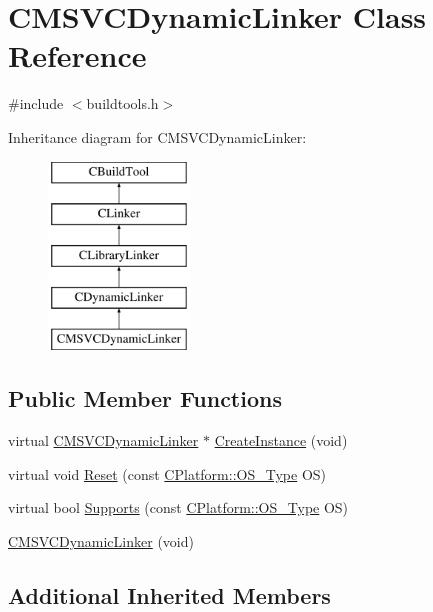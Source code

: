 \hypertarget{classCMSVCDynamicLinker}{\section{C\-M\-S\-V\-C\-Dynamic\-Linker Class Reference}
\label{classCMSVCDynamicLinker}
}


{\ttfamily \#include $<$buildtools.\-h$>$}

Inheritance diagram for C\-M\-S\-V\-C\-Dynamic\-Linker\-:\begin{figure}[H]
\begin{center}
\leavevmode
\includegraphics[height=5.000000cm]{da/d24/classCMSVCDynamicLinker}
\end{center}
\end{figure}
\subsection*{Public Member Functions}
\begin{DoxyCompactItemize}
\item 
virtual \hyperlink{classCMSVCDynamicLinker}{C\-M\-S\-V\-C\-Dynamic\-Linker} $\ast$ \hyperlink{classCMSVCDynamicLinker_ad8fc45d290987fb96b9a983b592a2ad1}{Create\-Instance} (void)
\item 
virtual void \hyperlink{classCMSVCDynamicLinker_aae22160e1bee1d4231ce669ac0132937}{Reset} (const \hyperlink{classCPlatform_a2fb735c63c53052f79629e338bb0f535}{C\-Platform\-::\-O\-S\-\_\-\-Type} O\-S)
\item 
virtual bool \hyperlink{classCMSVCDynamicLinker_a7ff4303d39016e448ca578a1130c8d80}{Supports} (const \hyperlink{classCPlatform_a2fb735c63c53052f79629e338bb0f535}{C\-Platform\-::\-O\-S\-\_\-\-Type} O\-S)
\item 
\hyperlink{classCMSVCDynamicLinker_a312ce3c3d93d087e95183638467b7044}{C\-M\-S\-V\-C\-Dynamic\-Linker} (void)
\end{DoxyCompactItemize}
\subsection*{Additional Inherited Members}


